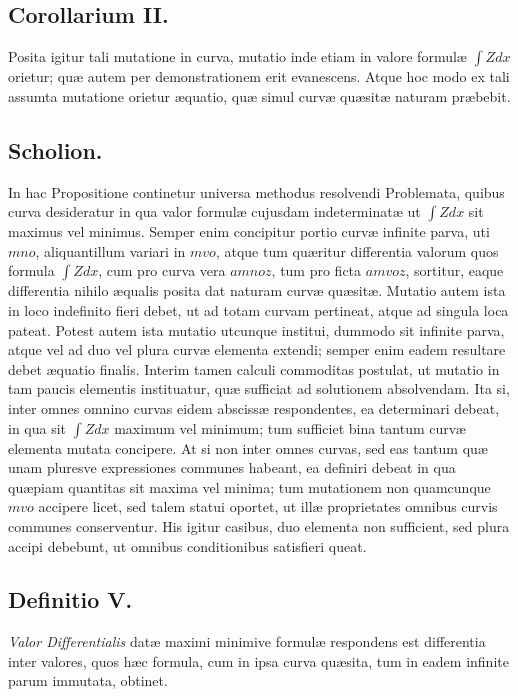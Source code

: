 \subsection*{Corollarium II.}
Posita igitur tali mutatione in curva, mutatio inde etiam in valore formulæ $\int Zdx$ orietur; quæ autem per demonstrationem erit evanescens. Atque hoc modo ex tali assumta mutatione orietur æquatio, quæ simul curvæ quæsitæ naturam præbebit.

\subsection*{Scholion.}
In hac Propositione continetur universa methodus resolvendi Problemata, quibus curva desideratur in qua valor formulæ cujusdam indeterminatæ ut $\int Zdx$ sit maximus vel minimus. Semper enim concipitur portio curvæ infinite parva, uti $mno$, aliquantillum variari in $mvo$, atque tum quæritur differentia valorum quos formula $\int Zdx$, cum pro curva vera $amnoz$, tum pro ficta $amvoz$, sortitur, eaque differentia nihilo æqualis posita dat naturam curvæ quæsitæ. Mutatio autem ista in loco indefinito fieri debet, ut ad totam curvam pertineat, atque ad singula loca pateat. Potest autem ista mutatio utcunque institui, dummodo sit infinite parva, atque vel ad duo vel plura curvæ elementa extendi; semper enim eadem resultare debet æquatio finalis. Interim tamen calculi commoditas postulat, ut mutatio in tam paucis elementis instituatur, quæ sufficiat ad solutionem absolvendam. Ita si, inter omnes omnino curvas eidem abscissæ respondentes, ea determinari debeat, in qua sit $\int Zdx$ maximum vel minimum; tum sufficiet bina tantum curvæ elementa mutata concipere. At si non inter omnes curvas, sed eas tantum quæ unam pluresve expressiones communes habeant, ea definiri debeat in qua quæpiam quantitas sit maxima vel minima; tum mutationem non quamcunque $mvo$ accipere licet, sed talem statui oportet, ut illæ proprietates omnibus curvis communes conserventur. His igitur casibus, duo elementa non sufficient, sed plura accipi debebunt, ut omnibus conditionibus satisfieri queat.

\subsection*{Definitio V.}
\textit{Valor Differentialis} datæ maximi minimive formulæ respondens est differentia inter valores, quos hæc formula, cum in ipsa curva quæsita, tum in eadem infinite parum immutata, obtinet.

